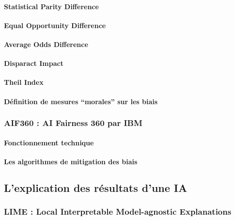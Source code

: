 \documentclass[10pt, french, a4paper]{report}
\begin{document}
\paragraph{Statistical Parity Difference}

\paragraph{Equal Opportunity Difference}

\paragraph{Average Odds Difference}

\paragraph{Disparact Impact}

\paragraph{Theil Index}

\paragraph{Définition de mesures ``morales'' sur les biais}

\subsubsection{AIF360 : AI Fairness 360 par IBM}

\paragraph{Fonctionnement technique}

\paragraph{Les algorithmes de mitigation des biais}

\subsection{L'explication des résultats d'une IA}

\subsubsection{LIME : Local Interpretable Model-agnostic Explanations}
\end{document}
